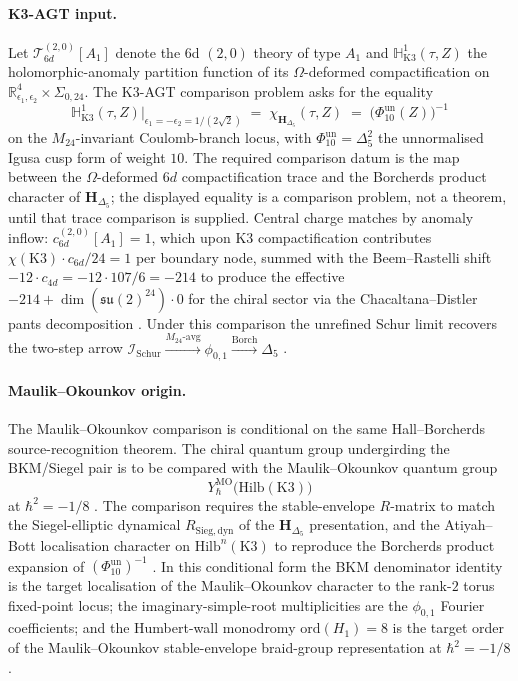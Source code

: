 \paragraph{K3-AGT input.}
Let $\mathcal{T}_{6d}^{(2,0)}[A_1]$ denote the 6d $(2,0)$ theory
of type $A_1$ and $\mathbb{H}^1_{\mathrm{K3}}(\tau,Z)$ the
holomorphic-anomaly partition function of its $\Omega$-deformed
compactification on $\mathbb{R}^4_{\epsilon_1,\epsilon_2}\times
\Sigma_{0,24}$. The K3-AGT comparison problem asks for the equality
\[
 \mathbb{H}^1_{\mathrm{K3}}(\tau,Z)\big|_{\epsilon_1=-\epsilon_2=1/(2\sqrt{2})}
 \;=\;
 \chi_{\mathbf{H}_{\Delta_5}}(\tau,Z)
 \;=\;
 \bigl(\Phi_{10}^{\mathrm{un}}(Z)\bigr)^{-1}
\]
on the $M_{24}$-invariant Coulomb-branch locus, with
$\Phi_{10}^{\mathrm{un}}=\Delta_5^2$ the unnormalised Igusa cusp
form of weight $10$. The required comparison datum is the map between
the $\Omega$-deformed $6d$ compactification trace and the Borcherds
product character of $\mathbf H_{\Delta_5}$; the displayed equality
is a comparison problem, not a theorem, until that trace comparison is
supplied.
Central charge matches by
anomaly inflow: $c_{6d}^{(2,0)}[A_1] = 1$, which upon K3
compactification contributes $\chi(\mathrm{K3})\cdot c_{6d}/24 =
1$ per boundary node, summed with the Beem--Rastelli shift
$-12\cdot c_{4d} = -12 \cdot 107/6 = -214$ to produce the effective
$-214 + \dim(\mathfrak{su}(2)^{24})\cdot 0$ for the chiral sector
via the Chacaltana--Distler pants decomposition
\cite{AldayTachikawa10,CordovaGaiotto2016}. Under this comparison
the unrefined Schur limit recovers the two-step arrow
$\mathcal{I}_{\mathrm{Schur}}\xrightarrow{M_{24}\text{-avg}}
\phi_{0,1}\xrightarrow{\mathrm{Borch}}\Delta_5$ \cite{EguchiOoguriTachikawa2011}.

\paragraph{Maulik--Okounkov origin.}
The Maulik--Okounkov comparison is conditional on the same
Hall--Borcherds source-recognition theorem. The chiral quantum group
undergirding the BKM/Siegel pair is to be compared with the
Maulik--Okounkov quantum group
\[
 Y^{\mathrm{MO}}_\hbar\bigl(\mathrm{Hilb}(\mathrm{K3})\bigr)
\]
at $\hbar^2 = -1/8$ \cite{MaulikOkounkov12,SchiffmannVasserot13}.
The comparison requires the stable-envelope $R$-matrix to match the
Siegel-elliptic dynamical $R_{\mathrm{Sieg,dyn}}$ of the
$\mathbf{H}_{\Delta_5}$ presentation, and the Atiyah--Bott
localisation character on $\mathrm{Hilb}^n(\mathrm{K3})$ to reproduce
the Borcherds product expansion of
$(\Phi_{10}^{\mathrm{un}})^{-1}$ \cite{Borcherds1995,Borcherds1998}.
In this conditional form the BKM denominator identity is the target
localisation of the Maulik--Okounkov character to the rank-$2$ torus
fixed-point locus; the imaginary-simple-root multiplicities are the
$\phi_{0,1}$ Fourier coefficients; and the Humbert-wall monodromy
$\mathrm{ord}(H_1)=8$ is the target order of the Maulik--Okounkov
stable-envelope braid-group representation at $\hbar^2 = -1/8$.

